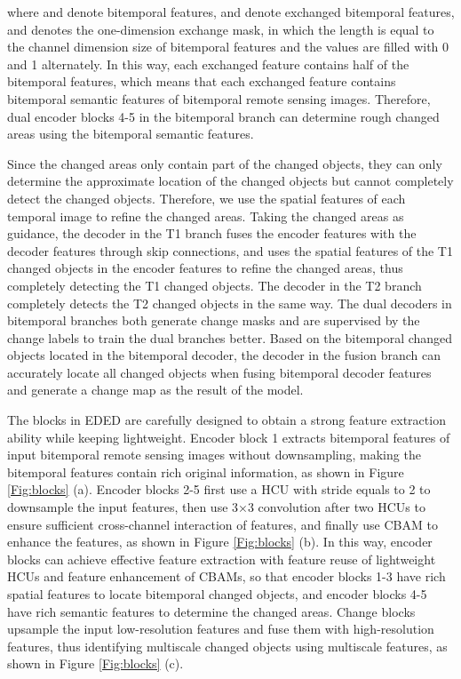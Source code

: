 \documentclass[journal]{IEEEtran}
\begin{document}
where  and  denote bitemporal features,  and  denote exchanged bitemporal features, and  denotes the one-dimension exchange mask, in which the length is equal to the channel dimension size of bitemporal features and the values are filled with 0 and 1 alternately. In this way, each exchanged feature contains half of the bitemporal features, which means that each exchanged feature contains bitemporal semantic features of bitemporal remote sensing images. Therefore, dual encoder blocks 4-5 in the bitemporal branch can determine rough changed areas using the bitemporal semantic features.

Since the changed areas only contain part of the changed objects, they can only determine the approximate location of the changed objects but cannot completely detect the changed objects. Therefore, we use the spatial features of each temporal image to refine the changed areas. Taking the changed areas as guidance, the decoder in the T1 branch fuses the encoder features with the decoder features through skip connections, and uses the spatial features of the T1 changed objects in the encoder features to refine the changed areas, thus completely detecting the T1 changed objects. The decoder in the T2 branch completely detects the T2 changed objects in the same way. The dual decoders in bitemporal branches both generate change masks and are supervised by the change labels to train the dual branches better. Based on the bitemporal changed objects located in the bitemporal decoder, the decoder in the fusion branch can accurately locate all changed objects when fusing bitemporal decoder features and generate a change map as the result of the model.

The blocks in EDED are carefully designed to obtain a strong feature extraction ability while keeping lightweight. Encoder block 1 extracts bitemporal features of input bitemporal remote sensing images without downsampling, making the bitemporal features contain rich original information, as shown in Figure \ref{Fig:blocks} (a). Encoder blocks 2-5 first use a HCU with stride equals to 2 to downsample the input features, then use 3×3 convolution after two HCUs to ensure sufficient cross-channel interaction of features, and finally use CBAM to enhance the features, as shown in Figure \ref{Fig:blocks} (b). In this way, encoder blocks can achieve effective feature extraction with feature reuse of lightweight HCUs and feature enhancement of CBAMs, so that encoder blocks 1-3 have rich spatial features to locate bitemporal changed objects, and encoder blocks 4-5 have rich semantic features to determine the changed areas. Change blocks upsample the input low-resolution features and fuse them with high-resolution features, thus identifying multiscale changed objects using multiscale features, as shown in Figure \ref{Fig:blocks} (c).
\end{document}
